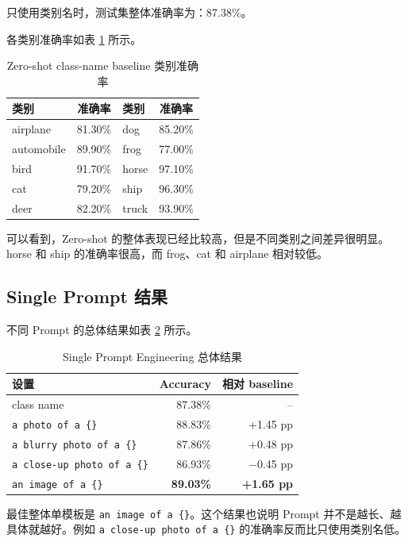 \documentclass[UTF8,11pt,a4paper]{ctexart}
\renewcommand{\arraystretch}{1.2}
\begin{document}
只使用类别名时，测试集整体准确率为：87.38\%。

各类别准确率如表 \ref{tab:baseline_class} 所示。

\begin{table}[H]
	\centering
	\caption{Zero-shot class-name baseline 类别准确率}
	\label{tab:baseline_class}
	\setlength{\tabcolsep}{14pt}
	\renewcommand{\arraystretch}{1.15}
	\begin{tabular}{l c l c}
		\toprule
		类别 & 准确率 & 类别 & 准确率 \\
		\midrule
		airplane   & 81.30\% & dog   & 85.20\% \\
		automobile & 89.90\% & frog  & 77.00\% \\
		bird       & 91.70\% & horse & 97.10\% \\
		cat        & 79.20\% & ship  & 96.30\% \\
		deer       & 82.20\% & truck & 93.90\% \\
		\bottomrule
	\end{tabular}
\end{table}

可以看到，Zero-shot 的整体表现已经比较高，但是不同类别之间差异很明显。horse 和 ship 的准确率很高，而 frog、cat 和 airplane 相对较低。

\subsection{Single Prompt 结果}

不同 Prompt 的总体结果如表 \ref{tab:prompt_result} 所示。

\begin{table}[H]
\centering
\caption{Single Prompt Engineering 总体结果}
\label{tab:prompt_result}
\begin{tabular}{lrr}
\toprule
设置 & Accuracy & 相对 baseline \\
\midrule
class name & 87.38\% & -- \\
\texttt{a photo of a \{\}} & 88.83\% & +1.45 pp \\
\texttt{a blurry photo of a \{\}} & 87.86\% & +0.48 pp \\
\texttt{a close-up photo of a \{\}} & 86.93\% & $-$0.45 pp \\
\texttt{an image of a \{\}} & \textbf{89.03\%} & \textbf{+1.65 pp} \\
\bottomrule
\end{tabular}
\end{table}

最佳整体单模板是 \texttt{an image of a \{\}}。这个结果也说明 Prompt 并不是越长、越具体就越好。例如 \texttt{a close-up photo of a \{\}} 的准确率反而比只使用类别名低。
\end{document}
